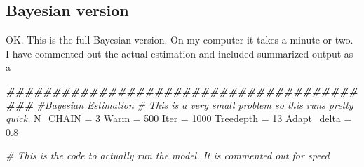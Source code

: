 \documentclass[
]{article}
\newenvironment{Shaded}{\begin{snugshade}}{\end{snugshade}}
\newcommand{\CommentTok}[1]{\textcolor[rgb]{0.56,0.35,0.01}{\textit{#1}}}
\newcommand{\DecValTok}[1]{\textcolor[rgb]{0.00,0.00,0.81}{#1}}
\newcommand{\DocumentationTok}[1]{\textcolor[rgb]{0.56,0.35,0.01}{\textbf{\textit{#1}}}}
\newcommand{\FloatTok}[1]{\textcolor[rgb]{0.00,0.00,0.81}{#1}}
\newcommand{\NormalTok}[1]{#1}
\newcommand{\OtherTok}[1]{\textcolor[rgb]{0.56,0.35,0.01}{#1}}
\begin{document}
\hypertarget{bayesian-version}{%
\subsection{Bayesian version}\label{bayesian-version}}

OK. This is the full Bayesian version. On my computer it takes a minute
or two. I have commented out the actual estimation and included
summarized output as a

\begin{Shaded}
\begin{Highlighting}[]
  \DocumentationTok{\#\#\#\#\#\#\#\#\#\#\#\#\#\#\#\#\#\#\#\#\#\#\#\#\#\#\#\#\#\#\#\#\#\#\#\#\#\#\#\#\#}
\CommentTok{\#Bayesian Estimation}
\CommentTok{\# This is a very small problem so this runs pretty quick.}
\NormalTok{N\_CHAIN }\OtherTok{=} \DecValTok{3}
\NormalTok{Warm }\OtherTok{=} \DecValTok{500}
\NormalTok{Iter }\OtherTok{=} \DecValTok{1000}
\NormalTok{Treedepth }\OtherTok{=} \DecValTok{13}
\NormalTok{Adapt\_delta }\OtherTok{=} \FloatTok{0.8}

\CommentTok{\# This is the code to actually run the model.  It is commented out for speed}


\end{Highlighting}
\end{Shaded}
\end{document}
